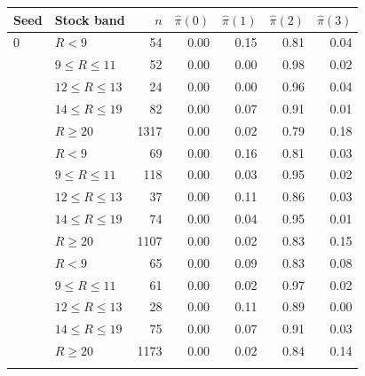 \begin{tabular}{llrrrrr}
\toprule
Seed & Stock band & $n$ & $\hat\pi(0)$ & $\hat\pi(1)$ & $\hat\pi(2)$ & $\hat\pi(3)$ \\
\midrule
0 & $R<9$ & 54 & 0.00 & 0.15 & 0.81 & 0.04 \\
 & $9\le R\le 11$ & 52 & 0.00 & 0.00 & 0.98 & 0.02 \\
 & $12\le R\le 13$ & 24 & 0.00 & 0.00 & 0.96 & 0.04 \\
 & $14\le R\le 19$ & 82 & 0.00 & 0.07 & 0.91 & 0.01 \\
 & $R\ge 20$ & 1317 & 0.00 & 0.02 & 0.79 & 0.18 \\
\addlinespace
1 & $R<9$ & 69 & 0.00 & 0.16 & 0.81 & 0.03 \\
 & $9\le R\le 11$ & 118 & 0.00 & 0.03 & 0.95 & 0.02 \\
 & $12\le R\le 13$ & 37 & 0.00 & 0.11 & 0.86 & 0.03 \\
 & $14\le R\le 19$ & 74 & 0.00 & 0.04 & 0.95 & 0.01 \\
 & $R\ge 20$ & 1107 & 0.00 & 0.02 & 0.83 & 0.15 \\
\addlinespace
2 & $R<9$ & 65 & 0.00 & 0.09 & 0.83 & 0.08 \\
 & $9\le R\le 11$ & 61 & 0.00 & 0.02 & 0.97 & 0.02 \\
 & $12\le R\le 13$ & 28 & 0.00 & 0.11 & 0.89 & 0.00 \\
 & $14\le R\le 19$ & 75 & 0.00 & 0.07 & 0.91 & 0.03 \\
 & $R\ge 20$ & 1173 & 0.00 & 0.02 & 0.84 & 0.14 \\
\addlinespace
\bottomrule
\end{tabular}
